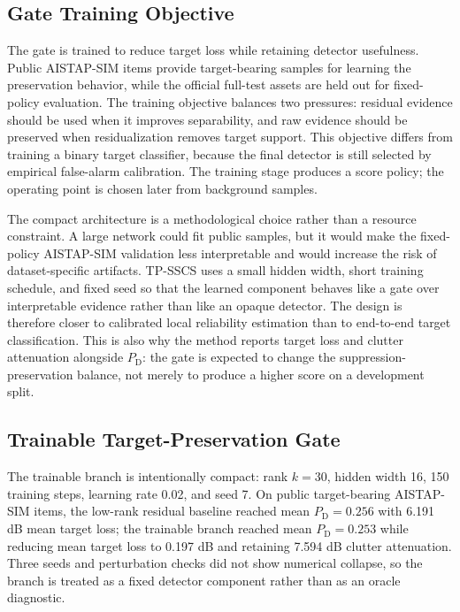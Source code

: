 \documentclass[journal]{IEEEtran}
\begin{document}
\subsection{Gate Training Objective}

The gate is trained to reduce target loss while retaining detector usefulness. Public AISTAP-SIM items provide target-bearing samples for learning the preservation behavior, while the official full-test assets are held out for fixed-policy evaluation. The training objective balances two pressures: residual evidence should be used when it improves separability, and raw evidence should be preserved when residualization removes target support. This objective differs from training a binary target classifier, because the final detector is still selected by empirical false-alarm calibration. The training stage produces a score policy; the operating point is chosen later from background samples.

The compact architecture is a methodological choice rather than a resource constraint. A large network could fit public samples, but it would make the fixed-policy AISTAP-SIM validation less interpretable and would increase the risk of dataset-specific artifacts. TP-SSCS uses a small hidden width, short training schedule, and fixed seed so that the learned component behaves like a gate over interpretable evidence rather than like an opaque detector. The design is therefore closer to calibrated local reliability estimation than to end-to-end target classification. This is also why the method reports target loss and clutter attenuation alongside $P_{\mathrm{D}}$: the gate is expected to change the suppression-preservation balance, not merely to produce a higher score on a development split.

\subsection{Trainable Target-Preservation Gate}

The trainable branch is intentionally compact: rank $k=30$, hidden width 16, 150 training steps, learning rate 0.02, and seed 7. On public target-bearing AISTAP-SIM items, the low-rank residual baseline reached mean $P_{\mathrm{D}}=0.256$ with 6.191 dB mean target loss; the trainable branch reached mean $P_{\mathrm{D}}=0.253$ while reducing mean target loss to 0.197 dB and retaining 7.594 dB clutter attenuation. Three seeds and perturbation checks did not show numerical collapse, so the branch is treated as a fixed detector component rather than as an oracle diagnostic.
\end{document}
